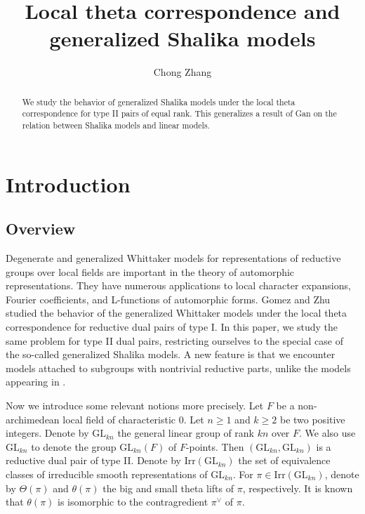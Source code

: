 \documentclass[11pt,reqno]{amsart}
\title{Local theta correspondence and generalized Shalika models}
\author{Chong Zhang}
\renewcommand{\1}{{\mathbf{1}}} \newcommand{\sB}{{\mathscr{B}}}
\newcommand{\GL}{{\mathrm{GL}}}\newcommand{\G}{{\mathrm{G}}}
\newcommand{\Irr}{{\mathrm{Irr}}} \newcommand{\cInd}{{\mathrm{c-Ind}}}
\theoremstyle{plain}
\theoremstyle{definition}
\numberwithin{equation}{section}
\begin{document}
\date{}
\maketitle

\begin{abstract}
We study the behavior of generalized Shalika models under the local theta correspondence for type II pairs of equal rank. This generalizes a result of Gan on the relation between Shalika models and linear models.
\end{abstract}


\tableofcontents

\section{Introduction}

\subsection{Overview} Degenerate and generalized Whittaker models for representations of reductive groups over local fields are important in the theory of automorphic representations. They have numerous applications to local character expansions, Fourier coefficients, and L-functions of  automorphic forms.
Gomez and Zhu \cite{gz} studied the behavior of the generalized Whittaker models under the local theta correspondence for reductive dual pairs of type I. In this paper, we study the same problem for type II dual pairs, restricting ourselves to the special case of the so-called generalized Shalika models. A new feature is that we encounter models attached to subgroups with nontrivial reductive parts, unlike the models appearing in \cite{gz}.  
 
Now we introduce some relevant notions more precisely.
Let $F$ be a non-archimedean local field of characteristic 0. Let $n\geq 1$ and $k\geq2$ be two positive integers. Denote by $\GL_{kn}$ the general linear group of rank $kn$ over $F$. We also use 
$\GL_{kn}$ to denote the group $\GL_{kn}(F)$ of $F$-points.  Then $(\GL_{kn},\GL_{kn})$ is a reductive dual pair of type II. Denote by $\Irr(\GL_{kn})$ the set of equivalence classes of irreducible smooth representations of $\GL_{kn}$. For $\pi\in\Irr(\GL_{kn})$, denote by $\Theta(\pi)$ and $\theta(\pi)$ the big and small theta lifts of $\pi$, respectively. It is known that $\theta(\pi)$ is isomorphic to the contragredient 
$\pi^\vee$ of $\pi$. 
\end{document}
